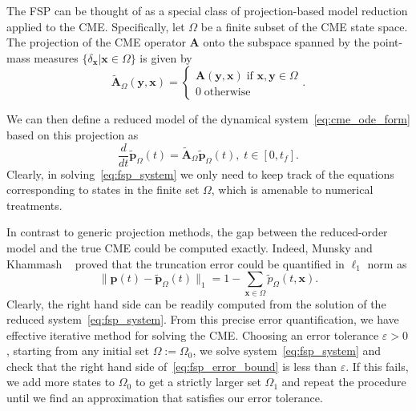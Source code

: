 \documentclass[1p]{article}
\newcommand{\tf}{t_{f}}
\begin{document}
The FSP can be thought of as a special class of projection-based model reduction applied to the CME. Specifically, let $\Omega$ be a finite subset of the CME state space. The projection of the CME operator $\bm{A}$ onto the subspace spanned by the point-mass measures $\{ \delta_{\bm{x}} \vert \bm{x} \in \Omega\}$ is given by
\begin{equation}
  \widetilde{\bm{A}}_{\Omega}(\bm{y}, \bm{x}) =
  \begin{cases}
    \bm{A}(\bm{y}, \bm{x}) \; \text{if } \bm{x}, \bm{y} \in \Omega \\
    0 \; \text{otherwise}
  \end{cases}
  .
\end{equation}

We can then define a reduced model of the dynamical system~\eqref{eq:cme_ode_form} based on this projection as
\begin{equation}
  \label{eq:fsp_system}
  \frac{d}{dt}{\widetilde{\bm{p}}_{\Omega}}(t)
  =
  \widetilde{\bm{A}}_{\Omega}\widetilde{\bm{p}}_{\Omega}(t),
  \;
  t \in [0, \tf]
  .
\end{equation}
Clearly, in solving~\eqref{eq:fsp_system} we only need to keep track of the equations corresponding to states in the finite set $\Omega$, which is amenable to numerical treatments.

In contrast to generic projection methods, the gap between the reduced-order model and the true CME could be computed exactly. Indeed, Munsky and Khammash ~\cite[Theorem 2.2]{Munsky2006} proved that the truncation error could be quantified in $\ell_1$ norm as
\begin{equation}
  \label{eq:fsp_error_bound}
  \|\bm{p}(t) - \widetilde{\bm{p}}_{\Omega}(t)\|_{1}
  =
  1 - \sum_{\bm{x} \in \Omega}{\tilde{p}_{\Omega}(t, \bm{x})}.
\end{equation}
Clearly, the right hand side can be readily computed from the solution of the reduced system~\eqref{eq:fsp_system}.
From this precise error quantification, we have effective iterative method for solving the CME. Choosing an error tolerance $\varepsilon>0$, starting from any initial set $\Omega:=\Omega_{0}$, we solve system~\eqref{eq:fsp_system} and check that the right hand side of~\eqref{eq:fsp_error_bound} is less than $\varepsilon$. If this fails, we add more states to $\Omega_0$ to get a strictly larger set $\Omega_1$ and repeat the procedure until we find an approximation that satisfies our error tolerance.
\end{document}
